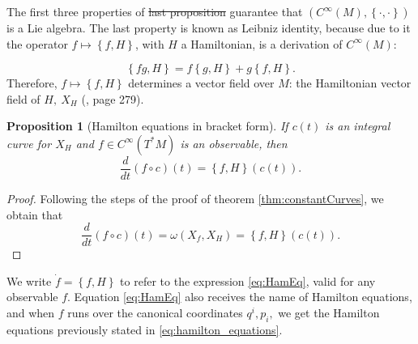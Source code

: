 \documentclass[12pt, letterpaper, reqno]{amsart}
\theoremstyle{definition}
\theoremstyle{plain}
\newtheorem{prop}{Proposition}
\theoremstyle{remark}
\providecommand{\DIFadd}[1]{{\protect\color{blue}\uwave{#1}}} %
\providecommand{\DIFdel}[1]{{\protect\color{red}\sout{#1}}}                      %
\providecommand{\DIFaddbegin}{} %
\providecommand{\DIFaddend}{} %
\providecommand{\DIFdelbegin}{} %
\providecommand{\DIFdelend}{} %
\newcommand{\DIFscaledelfig}{0.5}
\newlength{\DIFdelgraphicswidth} %
\newlength{\DIFdelgraphicsheight} %
\newcommand{\DIFaddincludegraphics}[2][]{{\color{blue}\fbox{\DIFOincludegraphics[#1]{#2}}}} %
\newcommand{\DIFdelincludegraphics}[2][]{%
\sbox{\DIFdelgraphicsbox}{\DIFOincludegraphics[#1]{#2}}%
\settoboxwidth{\DIFdelgraphicswidth}{\DIFdelgraphicsbox} %
\settoboxtotalheight{\DIFdelgraphicsheight}{\DIFdelgraphicsbox} %
\scalebox{\DIFscaledelfig}{%
\parbox[b]{\DIFdelgraphicswidth}{\usebox{\DIFdelgraphicsbox}\\[-\baselineskip] \rule{\DIFdelgraphicswidth}{0em}}\llap{\resizebox{\DIFdelgraphicswidth}{\DIFdelgraphicsheight}{%
\setlength{\unitlength}{\DIFdelgraphicswidth}%
\begin{picture}(1,1)%
\thicklines\linethickness{2pt} %
{\color[rgb]{1,0,0}\put(0,0){\framebox(1,1){}}}%
{\color[rgb]{1,0,0}\put(0,0){\line( 1,1){1}}}%
{\color[rgb]{1,0,0}\put(0,1){\line(1,-1){1}}}%
\end{picture}%
}\hspace*{3pt}}} %
} %
\DeclareRobustCommand{\DIFaddbegin}{\DIFOaddbegin \let\includegraphics\DIFaddincludegraphics} %
\DeclareRobustCommand{\DIFaddend}{\DIFOaddend \let\includegraphics\DIFOincludegraphics} %
\DeclareRobustCommand{\DIFdelbegin}{\DIFOdelbegin \let\includegraphics\DIFdelincludegraphics} %
\DeclareRobustCommand{\DIFdelend}{\DIFOaddend \let\includegraphics\DIFOincludegraphics} %
\begin{document}
The first three properties of \DIFdelbegin \DIFdel{last proposition }\DIFdelend \DIFaddbegin \DIFadd{Proposition \ref{prop:Poisson_bracket_properties} }\DIFaddend guarantee that $ \left( C^\infty(M), \left\{ \cdot,\cdot \right\}  \right) $ is a Lie algebra. The last property is known as Leibniz identity, because due to it the operator $ f\mapsto \left\{ f,H \right\}  $, with $ H $ a Hamiltonian, is a derivation of $ C^\infty(M): $ 

$$ \left\{ fg,H \right\} =f \left\{ g,H \right\} +g \left\{ f,H \right\} . $$ 
Therefore, $ f\mapsto \left\{ f,H \right\}  $ determines a vector field over $M$: the Hamiltonian vector field of $ H, \ X_H $ (\cite{montgomery2002tour}, page 279).

\begin{prop}[Hamilton equations in bracket form]\label{prop:HEBF}
	If $ c(t) $ is an integral curve for $ X_H $ and $ f\in C^\infty(T^*M) $ is an observable, then
	\begin{equation}\label{eq:HamEq}
		\frac{d}{dt} \left( f\circ c \right)(t) = \left\{ f,H \right\} (c(t)).
	\end{equation}
\end{prop}
\begin{proof}
	Following the steps of the proof of theorem \ref{thm:constantCurves}, we obtain that
	$$ \frac{d}{dt} \left( f\circ c \right) (t)=\omega(X_f, X_H)= \left\{ f,H \right\}(c(t)).  $$ 
\end{proof}

We write $ \dot{f}= \left\{ f,H \right\} $ to refer to the expression \eqref{eq:HamEq}, valid for any observable $ f. $ Equation \eqref{eq:HamEq} also receives the name of Hamilton equations, and when $ f $ runs over the canonical coordinates $ q^i,p_i, $ we get the Hamilton equations previously stated in \eqref{eq:hamilton_equations}.
\end{document}
